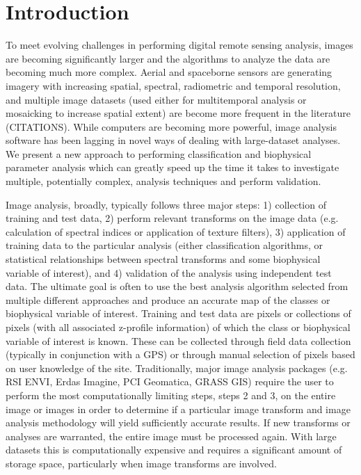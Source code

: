 \documentclass{elsart}
\begin{document}
\section{Introduction}\label{intro}


To meet evolving challenges in performing digital remote
sensing analysis, images are becoming significantly larger
and the algorithms to analyze the data are becoming much
more complex. Aerial and spaceborne sensors are generating
imagery with increasing spatial, spectral, radiometric and
temporal resolution, and multiple image datasets (used
either for multitemporal analysis or mosaicking to increase
spatial extent) are become more frequent in the literature
(CITATIONS). While computers are becoming more powerful,
image analysis software has been lagging in novel ways of
dealing with large-dataset analyses. We present a new
approach to performing classification and biophysical
parameter analysis which can greatly speed up the time it
takes to investigate multiple, potentially complex, analysis
techniques and perform validation.
	
Image analysis, broadly, typically follows three major
steps: 1) collection of training and test data, 2) perform
relevant transforms on the image data (e.g. calculation of
spectral indices or application of texture filters), 3)
application of training data to the particular analysis
(either classification algorithms, or statistical
relationships between spectral transforms and some
biophysical variable of interest), and 4) validation of the
analysis using independent test data. The ultimate goal is
often to use the best analysis algorithm selected from
multiple different approaches and produce an accurate map of
the classes or biophysical variable of interest. Training
and test data are pixels or collections of pixels (with all
associated z-profile information) of which the class or
biophysical variable of interest is known. These can be
collected through field data collection (typically in
conjunction with a GPS) or through manual selection of
pixels based on user knowledge of the site. Traditionally,
major image analysis packages (e.g. RSI ENVI, Erdas Imagine,
PCI Geomatica, GRASS GIS) require the user to perform the
most computationally limiting steps, steps 2 and 3, on the
entire image or images in order to determine if a particular
image transform and image analysis methodology will yield
sufficiently accurate results. If new transforms or analyses
are warranted, the entire image must be processed again.
With large datasets this is computationally expensive and
requires a significant amount of storage space, particularly
when image transforms are involved.
	
\end{document}
